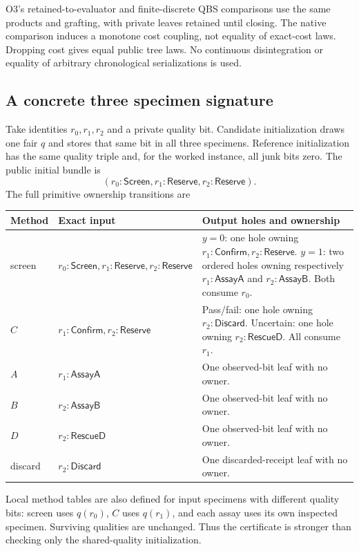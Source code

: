 O3's retained-to-evaluator and finite-discrete QBS comparisons use the
same products and grafting, with private leaves retained until closing.
The native comparison induces a monotone cost coupling, not equality of
exact-cost laws. Dropping cost gives equal public tree laws. No
continuous disintegration or equality of arbitrary chronological
serializations is used.

\subsection{A concrete three specimen signature}
Take identities $r_0,r_1,r_2$ and a private quality bit. Candidate
initialization draws one fair $q$ and stores that same bit in all three
specimens. Reference initialization has the same quality triple and,
for the worked instance, all junk bits zero. The public initial bundle is
\[
(r_0:\mathsf{Screen},r_1:\mathsf{Reserve},r_2:\mathsf{Reserve}).
\]
The full primitive ownership transitions are
\begin{longtable}{@{}p{.12\linewidth}p{.27\linewidth}p{.53\linewidth}@{}}
\toprule Method&Exact input&Output holes and ownership\\\midrule\endhead
screen&$r_0:\mathsf{Screen},r_1:\mathsf{Reserve},r_2:\mathsf{Reserve}$&
$y=0$: one hole owning $r_1:\mathsf{Confirm},r_2:\mathsf{Reserve}$.
$y=1$: two ordered holes owning respectively $r_1:\mathsf{AssayA}$ and
$r_2:\mathsf{AssayB}$. Both consume $r_0$.\\
$C$&$r_1:\mathsf{Confirm},r_2:\mathsf{Reserve}$&
Pass/fail: one hole owning $r_2:\mathsf{Discard}$.
Uncertain: one hole owning $r_2:\mathsf{RescueD}$. All consume $r_1$.\\
$A$&$r_1:\mathsf{AssayA}$&One observed-bit leaf with no owner.\\
$B$&$r_2:\mathsf{AssayB}$&One observed-bit leaf with no owner.\\
$D$&$r_2:\mathsf{RescueD}$&One observed-bit leaf with no owner.\\
discard&$r_2:\mathsf{Discard}$&One discarded-receipt leaf with no owner.\\
\bottomrule
\end{longtable}
Local method tables are also defined for input specimens with different
quality bits: screen uses $q(r_0)$, $C$ uses $q(r_1)$, and each assay
uses its own inspected specimen. Surviving qualities are unchanged.
Thus the certificate is stronger than checking only the shared-quality
initialization.

